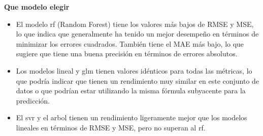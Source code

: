 \documentclass[
  11pt,
  bookmarksnumbered]{article}
\begin{document}
\begin{table}[H]

\caption{\label{tab:unnamed-chunk-27}Base de Datos de prueba semanal}
\centering
{}
\end{table}

\textbf{Que modelo elegir}

\begin{itemize}
\item
  El modelo rf (Random Forest) tiene los valores más bajos de RMSE y MSE, lo que indica que generalmente ha tenido un mejor desempeño en términos de minimizar los errores cuadrados.
  También tiene el MAE más bajo, lo que sugiere que tiene una buena precisión en términos de errores absolutos.
\item
  Los modelos lineal y glm tienen valores idénticos para todas las métricas, lo que podría indicar que tienen un rendimiento muy similar en este conjunto de datos o que podrían estar utilizando la misma fórmula subyacente para la predicción.
\item
  El svr y el arbol tienen un rendimiento ligeramente mejor que los modelos lineales en términos de RMSE y MSE, pero no superan al rf.
\end{itemize}
\end{document}
